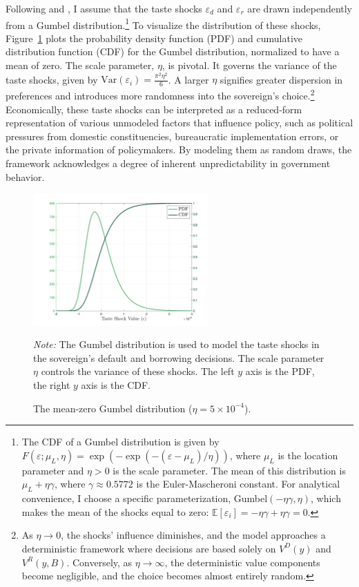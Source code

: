 \documentclass[12pt]{article}
\theoremstyle{plain}
\begin{document}
Following \citet{DvorkinSancheSaprizaYurdagul2021} and
\citet{MIHALACHEOREEF2024}, I assume that the taste shocks $\varepsilon_d$ and
$\varepsilon_r$ are drawn independently from a Gumbel
distribution.\footnote{The CDF of a Gumbel distribution is given by
	$F(\varepsilon; \mu_L, \eta) = \exp(-\exp(-(\varepsilon-\mu_L)/\eta))$, where
	$\mu_L$ is the location parameter and $\eta > 0$ is the scale parameter. The
	mean of this distribution is $\mu_L + \eta\gamma$, where $\gamma \approx
		0.5772$ is the Euler-Mascheroni constant. For analytical convenience, I choose
	a specific parameterization, Gumbel$(-\eta\gamma, \eta)$, which makes the mean
	of the shocks equal to zero: $\mathbb{E}[\varepsilon_i] = -\eta\gamma +
		\eta\gamma = 0$.} To visualize the distribution of these shocks,
Figure~\ref{fig:gumbel_dist} plots the probability density function (PDF) and
cumulative distribution function (CDF) for the Gumbel distribution, normalized
to have a mean of zero. The scale parameter, $\eta$, is pivotal. It governs the
variance of the taste shocks, given by $\text{Var}(\varepsilon_i) = \frac{\pi^2
		\eta^2}{6}$. A larger $\eta$ signifies greater dispersion in preferences and
introduces more randomness into the sovereign's choice.\footnote{As $\eta \to
		0$, the shocks' influence diminishes, and the model approaches a deterministic
	framework where decisions are based solely on $V^D(y)$ and $V^R(y,B)$.
	Conversely, as $\eta \to \infty$, the deterministic value components become
	negligible, and the choice becomes almost entirely random.} Economically, these
taste shocks can be interpreted as a reduced-form representation of various
unmodeled factors that influence policy, such as political pressures from
domestic constituencies, bureaucratic implementation errors, or the private
information of policymakers. By modeling them as random draws, the framework
acknowledges a degree of inherent unpredictability in government behavior.
\begin{figure}[htbp]
	\centering
	\includegraphics[width=0.6\textwidth]{gumbel_distribution.png}
	\caption{The mean-zero Gumbel distribution ($\eta=5\times 10^{-4}$).}
	\label{fig:gumbel_dist}
	\parbox{\linewidth}{\small\textit{Note:} The Gumbel distribution is used to model the taste shocks in the sovereign's default and borrowing decisions. The scale parameter $\eta$ controls the variance of these shocks. The left $y$ axis is the PDF, the right $y$ axis is the CDF.}
\end{figure}
\end{document}
